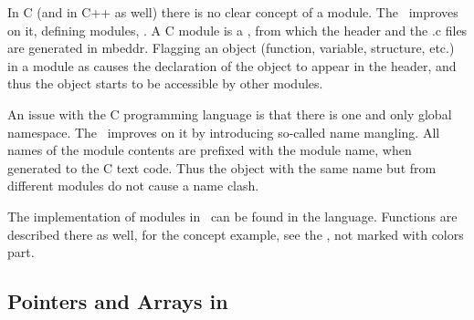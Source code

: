 In C (and in C++ as well) there is no clear concept of a module. The \mbp\ improves on it, defining 
modules, \cite{Voelter:MoDELS:2010}. A C module is a , from which the header and the .c files are generated in mbeddr.
Flagging an object (function, variable, structure, etc.) in a module as  causes the declaration of the object to appear
in the header, and thus the object starts to be accessible by other modules.

An issue with the C programming language is that there is one and only global namespace. The \mbp\ improves on it 
by introducing so-called name mangling. All names of the module contents are prefixed with the module name,
when generated to the C text code. Thus the object with the same name but from different modules do
not cause a name clash.

The implementation of modules in \mbdr\ can be found in the  language. Functions are described there as well,
for the  concept example, see the , not marked with colors part.

\subsection{Pointers and Arrays in \mbdr}





